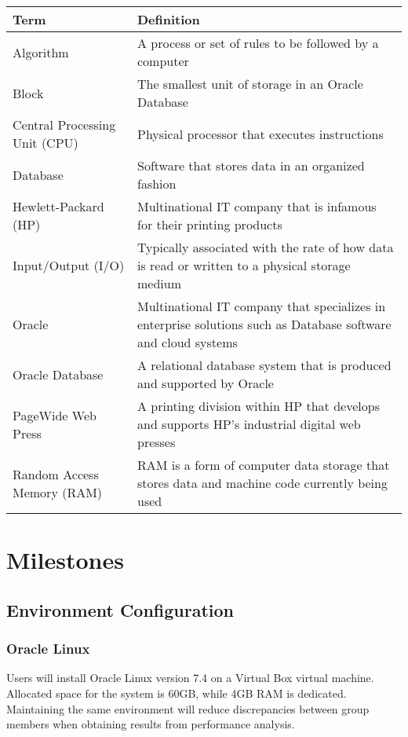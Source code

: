 \documentclass[10pt]{article}
\begin{document}
\begin{center}
    \begin{tabular}{ | l | p{11cm} |}
    \hline
    \textbf{Term} & \textbf{Definition}  \\ \hline
    Algorithm & A process or set of rules to be followed by a computer \\ \hline
    Block & The smallest unit of storage in an Oracle Database \\ \hline
    Central Processing Unit (CPU) & Physical processor that executes instructions  \\ \hline
    Database & Software that stores data in an organized fashion \\ \hline
    Hewlett-Packard (HP) & Multinational IT company that is infamous for their printing products \\ \hline
    Input/Output (I/O) & Typically associated with the rate of how data is read or written to a physical storage medium \\ \hline
    Oracle & Multinational IT company that specializes in enterprise solutions such as Database software and cloud systems \\ \hline
    Oracle Database & A relational database system that is produced and supported by Oracle \\ \hline
    PageWide Web Press & A printing division within HP that develops and supports HP's industrial digital web presses \\ \hline
    Random Access Memory (RAM) & RAM is a form of computer data storage that stores data and machine code currently being used\\ \hline
    \end{tabular}
\end{center}

\section{Milestones}
\subsection{Environment Configuration}
\subsubsection{Oracle Linux}
Users will install Oracle Linux version 7.4 on a Virtual Box virtual machine. Allocated space for the system is 60GB, while 4GB RAM is dedicated. Maintaining the same environment will reduce discrepancies between group members when obtaining results from performance analysis.
\end{document}
